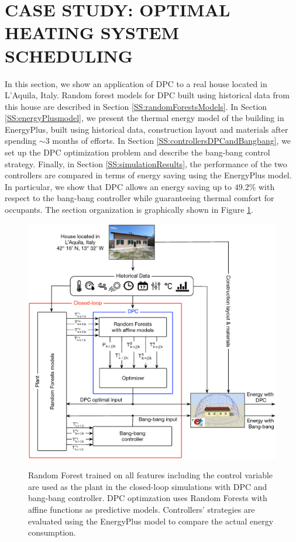 \section{CASE STUDY: OPTIMAL HEATING SYSTEM SCHEDULING}
\label{S:realCaseStudy}

In this section, we show an application of DPC to a real house located in L'Aquila, Italy. Random forest models for DPC built using historical data from this house are described in Section \ref{SS:randomForestsModels}. 
In Section \ref{SS:energyPlusmodel}, we present the thermal energy model of the building in EnergyPlus, built using historical data, construction layout and materials after spending $\sim3$ months of efforts.
In Section \ref{SS:controllersDPCandBangbang}, we set up the DPC optimization problem and describe the bang-bang control strategy. Finally, in Section \ref{SS:simulationResults}, the performance of the two controllers are compared in terms of energy saving using the EnergyPlus model. In particular, we show that DPC allows an energy saving up to $49.2\%$ with respect to the bang-bang controller while guaranteeing thermal comfort for occupants. The section organization is graphically shown in Figure \ref{F:overview}.
\begin{figure}[h!]
	\begin{center}
		\includegraphics[width=1\linewidth]{figures/overview.eps}
		\caption{Random Forest trained on all features including the control variable are used as the plant in the closed-loop simulations with DPC and bang-bang controller. DPC optimzation uses Random Forests with affine functions as predictive models. Controllers' strategies are evaluated using the EnergyPlus model to compare the actual energy consumption.}
		\captionsetup{justification=centering}
		\label{F:overview}
	\end{center}
\end{figure}

